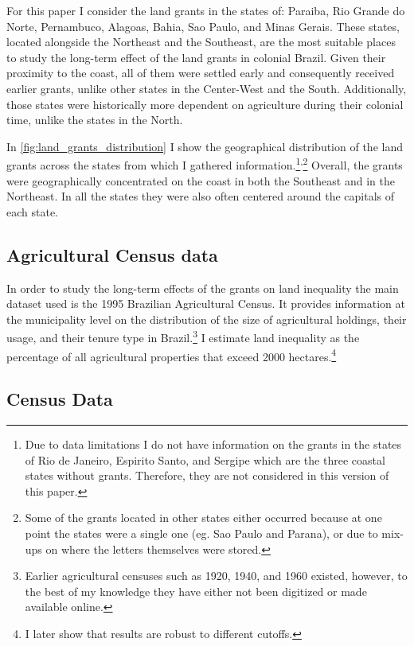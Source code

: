 \documentclass{article}
\begin{document}
For this paper I consider the land grants in the states of: Paraiba, Rio Grande do Norte, Pernambuco, Alagoas, Bahia, Sao Paulo, and Minas Gerais.
These states, located alongside the Northeast and the Southeast, are the most suitable places to study the long-term effect of the land grants in colonial Brazil.
Given their proximity to the coast, all of them were settled early and consequently received earlier grants, unlike other states in the Center-West and the South.
Additionally, those states were historically more dependent on agriculture during their colonial time, unlike the states in the North.

In \autoref{fig:land_grants_distribution} I show the geographical distribution of the land grants across the states from which I gathered information.\footnote{Due to data limitations I do not have information on the grants in the states of Rio de Janeiro, Espirito Santo, and Sergipe which are the three coastal states without grants. Therefore, they are not considered in this version of this paper.}\textsuperscript{,}\footnote{Some of the grants located in other states either occurred because at one point the states were a single one (eg. Sao Paulo and Parana), or due to mix-ups on where the letters themselves were stored.}
Overall, the grants were geographically concentrated on the coast in both the Southeast and in the Northeast. 
In all the states they were also often centered around the capitals of each state.


\subsection{Agricultural Census data}

In order to study the long-term effects of the grants on land inequality the main dataset used is the 1995 Brazilian Agricultural Census.
It provides information at the municipality level on the distribution of the size of agricultural holdings, their usage, and their tenure type in Brazil.\footnote{Earlier agricultural censuses such as 1920, 1940, and 1960 existed, however, to the best of my knowledge they have either not been digitized or made available online.}
I estimate land inequality as the percentage of all agricultural properties that exceed 2000 hectares.\footnote{I later show that results are robust to different cutoffs.}

\subsection{Census Data}
\end{document}
